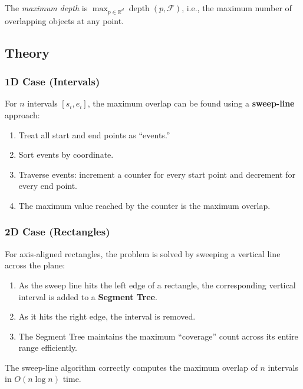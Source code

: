 \begin{definition}\label{def:maximum_depth}
The \emph{maximum depth} is $\max_{p \in \mathbb{R}^d} \operatorname{depth}(p, \mathcal{F})$, i.e., the maximum number of overlapping objects at any point.
\end{definition}

\subsection{Theory}

\subsubsection*{1D Case (Intervals)}

For $n$ intervals $[s_i, e_i]$, the maximum overlap can be found using a \textbf{sweep-line} approach:
\begin{enumerate}
\item Treat all start and end points as ``events.''
\item Sort events by coordinate.
\item Traverse events: increment a counter for every start point and decrement for every end point.
\item The maximum value reached by the counter is the maximum overlap.
\end{enumerate}

\subsubsection*{2D Case (Rectangles)}

For axis-aligned rectangles, the problem is solved by sweeping a vertical line across the plane:
\begin{enumerate}
\item As the sweep line hits the left edge of a rectangle, the corresponding vertical interval is added to a \textbf{Segment Tree}.
\item As it hits the right edge, the interval is removed.
\item The Segment Tree maintains the maximum ``coverage'' count across its entire range efficiently.
\end{enumerate}

\begin{theorem}\label{thm:max_overlap_1d}
The sweep-line algorithm correctly computes the maximum overlap of $n$ intervals in $O(n \log n)$ time.
\end{theorem}

